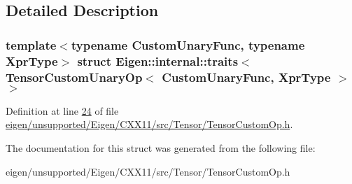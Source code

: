 \subsection{Detailed Description}
\subsubsection*{template$<$typename Custom\+Unary\+Func, typename Xpr\+Type$>$\newline
struct Eigen\+::internal\+::traits$<$ Tensor\+Custom\+Unary\+Op$<$ Custom\+Unary\+Func, Xpr\+Type $>$ $>$}



Definition at line \hyperlink{eigen_2unsupported_2_eigen_2_c_x_x11_2src_2_tensor_2_tensor_custom_op_8h_source_l00024}{24} of file \hyperlink{eigen_2unsupported_2_eigen_2_c_x_x11_2src_2_tensor_2_tensor_custom_op_8h_source}{eigen/unsupported/\+Eigen/\+C\+X\+X11/src/\+Tensor/\+Tensor\+Custom\+Op.\+h}.



The documentation for this struct was generated from the following file\+:\begin{DoxyCompactItemize}
\item 
eigen/unsupported/\+Eigen/\+C\+X\+X11/src/\+Tensor/\+Tensor\+Custom\+Op.\+h\end{DoxyCompactItemize}
